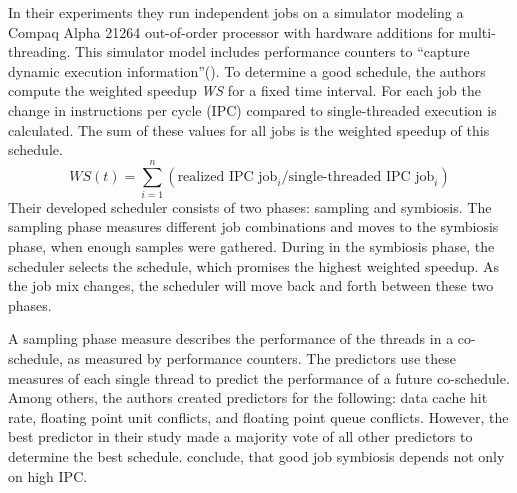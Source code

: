 In their experiments they run independent jobs on a simulator modeling a Compaq
Alpha 21264 out-of-order processor with hardware additions for multi-threading.
This simulator model includes performance counters to ``capture dynamic execution
information''(\autocite[236]{snavely_symbiotic_2000}).
To determine a good schedule, the authors compute the weighted speedup \textit{WS} for
a fixed time interval.
For each job the change in instructions per cycle (IPC) compared to
single-threaded execution is calculated.
The sum of these values for all jobs is the weighted speedup of this
schedule.
$$ WS(t) = \sum_{i=1}^n (\text{realized IPC job}_i / \text{single-threaded IPC
job}_i)$$
Their developed scheduler consists of two phases: sampling and symbiosis.
The sampling phase measures different job combinations and moves to the
symbiosis phase, when enough samples were gathered.
During in the symbiosis phase, the scheduler selects the schedule, which
promises the highest weighted speedup.
As the job mix changes, the scheduler will move back and forth between these two
phases.

A sampling phase measure describes the performance of the threads in a
co-schedule, as measured by performance counters.
The predictors use these measures of each single thread to predict the
performance of a future co-schedule.
Among others, the authors created predictors for the following:
data cache hit rate, floating point unit conflicts, and floating point queue
conflicts.
However, the best predictor in their study made a majority vote of all other
predictors to determine the best schedule.
\citeauthor{snavely_symbiotic_2000} conclude, that good job symbiosis depends
not only on high IPC.
\\

